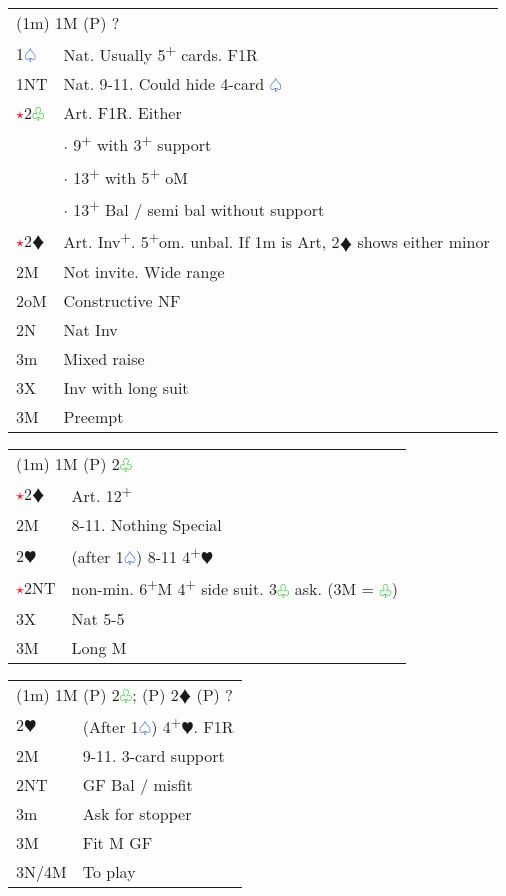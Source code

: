 \documentclass{article}
\renewcommand{\sp}{\textcolor{RoyalBlue}{$\varspade$}}
\newcommand{\he}{\textcolor{RubineRed}{$\varheart$}}
\newcommand{\di}{\textcolor{Peach}{$\vardiamond$}}
\newcommand{\cl}{\textcolor{LimeGreen}{$\varclub$}}
\newcommand{\nt}{\relsize{-1}NT\relsize{1}}
\newcommand{\up}{\textsuperscript{+}}
\newcommand{\al}{\textcolor{red}{$\star$}}
\begin{document}
\medskip

\begin{tabular}{|l|p{6.5cm}}
	\multicolumn{2}{l}{(1m) 1M (P) ? } \\
	1\sp{} & Nat. Usually 5\up{} cards. F1R \\
	1\nt{} & Nat. 9-11. Could hide 4-card \sp{} \\
	\al{}2\cl{} & Art. F1R. Either \\
	&	$\cdot$ 9\up{} with 3\up{} support \\
	&	$\cdot$ 13\up{} with 5\up{} oM \\
	&	$\cdot$ 13\up{} Bal / semi bal without support \\
	\al{}2\di{} & Art. Inv\up{}. 5\up{}om. unbal. If 1m is Art, 2\di{} shows either minor \\
	2M & Not invite. Wide range \\
	2oM & Constructive NF \\
	2N & Nat Inv \\
	3m & Mixed raise \\
	3X & Inv with long suit \\
	3M & Preempt \\
\end{tabular}

\medskip

\begin{tabular}{|l|p{6.5cm}}
	\multicolumn{2}{l}{(1m) 1M (P) 2\cl{} } \\
	\al{}2\di{} & Art. 12\up{} \\
	2M & 8-11. Nothing Special \\
	2\he{} & (after 1\sp{}) 8-11 4\up{}\he{} \\
	\al{}2\nt{} & non-min. 6\up{}M 4\up{} side suit. 3\cl{} ask. (3M = \cl{}) \\
	3X & Nat 5-5 \\
	3M & Long M \\
\end{tabular}

\medskip

\begin{tabular}{|l|p{6.5cm}}
	\multicolumn{2}{l}{(1m) 1M (P) 2\cl{}; (P) 2\di{} (P) ? } \\
	2\he{} & (After 1\sp{}) 4\up{}\he{}. F1R \\
	2M & 9-11. 3-card support \\
	2\nt{} & GF Bal / misfit \\
	3m & Ask for stopper \\
	3M & Fit M GF \\
	3N/4M & To play \\
\end{tabular}
\end{document}
